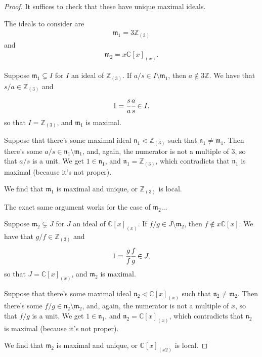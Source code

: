 \documentclass[12pt]{extarticle}
\newcommand{\C}{\mathbb{C}}
\newcommand{\Z}{\mathbb{Z}}
\newcommand{\<}{\langle}
\renewcommand{\>}{\rangle}
\theoremstyle{definition}
\begin{document}
\begin{proof}
  It suffices to check that these have unique maximal ideals.

  The ideals to consider are 
  \begin{align*}
    \mathfrak{m}_1 = 3\Z_{(3)}
  \end{align*}
  and 
  \begin{align*}
    \mathfrak{m}_2 = x \C[x]_{(x)}.
  \end{align*}

  Suppose $\mathfrak{m}_1 \subsetneq I$ for $I$ an ideal of $\Z_{(3)}$. If $a/s \in I \setminus \mathfrak{m}_1$, then $a \not \in 3\Z$. We have that $s/a \in \Z_{(3)}$ and 
  \begin{align}
    1 = \cfrac{s}{a} \cfrac{a}{s} \in I,
  \end{align}
  so that $I = \Z_{(3)}$, and $\mathfrak{m}_1$ is maximal.

  Suppose that there's some maximal ideal $\mathfrak{n}_1 \triangleleft \Z_{(3)}$ such that $\mathfrak{n}_1 \neq \mathfrak{m}_1$. Then there's some $a/s \in \mathfrak{n}_1 \setminus \mathfrak{m}_1$,
  and, again, the numerator is not a multiple of $3$, so that $a/s$ is a unit. We get $1 \in \mathfrak{n}_1$, and $\mathfrak{n}_1 = \Z_{(3)}$, which contradicts that $\mathfrak{n}_1$ is maximal (because it's not proper).

  We find that $\mathfrak{m}_1$ is maximal and unique, or $\Z_{(3)}$ is local.

  The exact same argument works for the case of $\mathfrak{m}_2$... 

  Suppose $\mathfrak{m}_2 \subsetneq J$ for $J$ an ideal of $\C[x]_{(x)}$. If $f/g \in J \setminus \mathfrak{m}_2$, then $f \not \in x\C[x]$. We have that $g/f \in \Z_{(3)}$ and 
  \begin{align}
    1 = \cfrac{g}{f} \cfrac{f}{g} \in J,
  \end{align}
  so that $J = \C[x]_{(x)}$, and $\mathfrak{m}_2$ is maximal.
  
  Suppose that there's some maximal ideal $\mathfrak{n}_2 \triangleleft \C[x]_{(x)}$ such that $\mathfrak{n}_2 \neq \mathfrak{m}_2$. Then there's some $f/g \in \mathfrak{n}_2 \setminus \mathfrak{m}_2$,
  and, again, the numerator is not a multiple of $x$, so that $f/g$ is a unit. We get $1 \in \mathfrak{n}_1$, and $\mathfrak{n}_2 = \C[x]_{(x)}$, which contradicts that $\mathfrak{n}_2$ is maximal (because it's not proper).

  We find that $\mathfrak{m}_2$ is maximal and unique, or $\C[x]_{(x2)}$ is local.
\end{proof}
\end{document}
